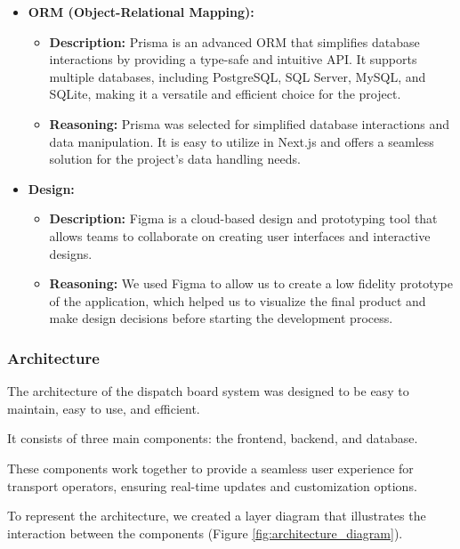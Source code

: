 \documentclass[10pt]{article}
\begin{document}
\begin{itemize}
                \item \textbf{ORM (Object-Relational Mapping):}
                \begin{itemize}
                    \item \textbf{Description:} Prisma is an advanced ORM that simplifies database interactions by providing a type-safe and intuitive API. It supports multiple databases, including PostgreSQL, SQL Server, MySQL, and SQLite, making it a versatile and efficient choice for the project.
                    \item \textbf{Reasoning:} Prisma was selected for simplified database interactions and data manipulation. It is easy to utilize in Next.js and offers a seamless solution for the project's data handling needs.
                \end{itemize}
                \item \textbf{Design:}
                \begin{itemize}
                    \item \textbf{Description:} Figma is a cloud-based design and prototyping tool that allows teams to collaborate on creating user interfaces and interactive designs.
                    \item \textbf{Reasoning:} We used Figma to allow us to create a low fidelity prototype of the application, which helped us to visualize the final product and make design decisions before starting the development process.
                \end{itemize}
        \end{itemize}


        \subsubsection{Architecture}
        The architecture of the dispatch board system was designed to be easy to maintain, easy to use, and efficient. 

        It consists of three main components: the frontend, backend, and database.

        These components work together to provide a seamless user experience for transport operators, ensuring real-time updates and customization options. 

        To represent the architecture, we created a layer diagram that illustrates the interaction between the components (Figure \ref{fig:architecture_diagram}).
\end{document}
